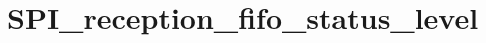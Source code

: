 \hypertarget{group___s_p_i__reception__fifo__status__level}{\section{S\-P\-I\-\_\-reception\-\_\-fifo\-\_\-status\-\_\-level}
\label{group___s_p_i__reception__fifo__status__level}
}
